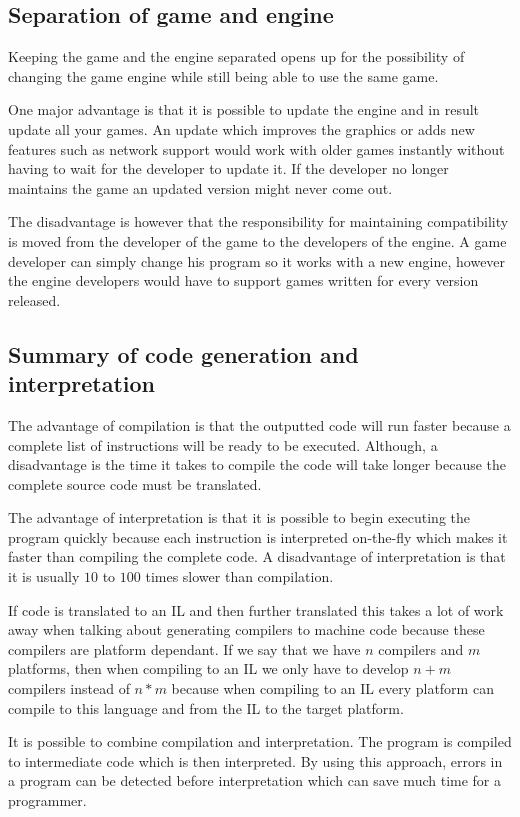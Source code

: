 

\subsection{Separation of game and engine}
\label{subsec:engineseperation}
Keeping the game and the engine separated opens up for the possibility of
changing the game engine while still being able to use the same game. 

One major advantage is that it is possible to update the engine and in result
update all your games. An update which improves the graphics or adds new
features such as network support would work with older games instantly without
having to wait for the developer to update it. If the developer no longer
maintains the game an updated version might never come out.

The disadvantage is however that the responsibility for maintaining
compatibility is moved from the developer of the game to the developers of the
engine. A game developer can simply change his program so it works with a new
engine, however the engine developers would have to support games written for
every version released.

\subsection{Summary of code generation and interpretation}
The advantage of compilation is that the outputted code will run faster because 
a complete list of instructions will be ready to be executed. Although,
a disadvantage is the time it takes to compile the code will take longer because
the complete source code must be translated.

The advantage of interpretation is that it is possible to begin executing the
program quickly because each instruction is interpreted on-the-fly which makes
it faster than compiling the complete code. A disadvantage of interpretation is
that it is usually $10$ to $100$ times slower than compilation.

If code is translated to an IL and then further translated this takes a
lot of work away when talking about generating compilers to machine code
because these compilers are platform dependant. If we say that we have
$n$ compilers and $m$ platforms, then when compiling to an IL we only
have to develop $n+m$ compilers instead of $n*m$ because when compiling
to an IL every platform can compile to this language and from the IL to
the target platform.

It is possible to combine compilation and interpretation. The program is
compiled to intermediate code which is then interpreted. By using this approach,
errors in a program can be detected before interpretation which can save much
time for a programmer.
